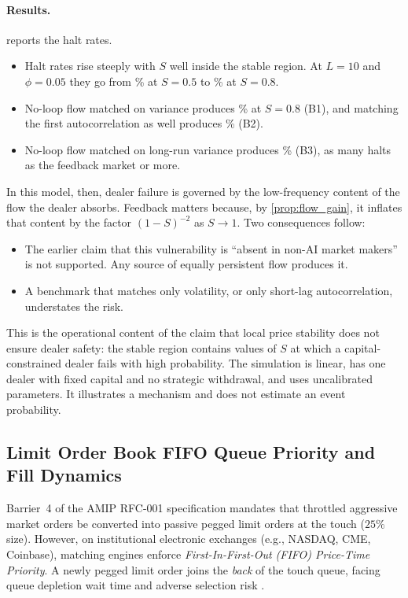 \documentclass[10pt,twocolumn,letterpaper]{article}
\theoremstyle{definition}
\theoremstyle{remark}
\begin{document}
\paragraph{Results.}  reports the halt rates.
\begin{itemize}
 \item Halt rates rise steeply with $S$ well inside the stable region. At $L=10$ and $\phi=0.05$ they go from \SolvFbLow\% at $S=0.5$ to \SolvFbHigh\% at $S=0.8$.
 \item No-loop flow matched on variance produces \SolvBoneHigh\% at $S=0.8$ (B1), and matching the first autocorrelation as well produces \SolvBtwoHigh\% (B2).
 \item No-loop flow matched on long-run variance produces \SolvBthreeHigh\% (B3), as many halts as the feedback market or more.
\end{itemize}
In this model, then, dealer failure is governed by the low-frequency content of the flow the dealer absorbs. Feedback matters because, by \cref{prop:flow_gain}, it inflates that content by the factor $(1-S)^{-2}$ as $S\to1$. Two consequences follow:
\begin{itemize}
 \item The earlier claim that this vulnerability is ``absent in non-AI market makers'' is not supported. Any source of equally persistent flow produces it.
 \item A benchmark that matches only volatility, or only short-lag autocorrelation, understates the risk.
\end{itemize}
This is the operational content of the claim that local price stability does not ensure dealer safety: the stable region contains values of $S$ at which a capital-constrained dealer fails with high probability. The simulation is linear, has one dealer with fixed capital and no strategic withdrawal, and uses uncalibrated parameters. It illustrates a mechanism and does not estimate an event probability.

\subsection{Limit Order Book FIFO Queue Priority and Fill Dynamics}
\label{sec:hft_queue_priority}
Barrier~4 of the AMIP RFC-001 specification mandates that throttled aggressive market orders be converted into passive pegged limit orders at the touch ($25\%$ size). However, on institutional electronic exchanges (e.g., NASDAQ, CME, Coinbase), matching engines enforce \emph{First-In-First-Out (FIFO) Price-Time Priority}. A newly pegged limit order joins the \emph{back} of the touch queue, facing queue depletion wait time and adverse selection risk \citep{cont2010stochastic}.
\end{document}
